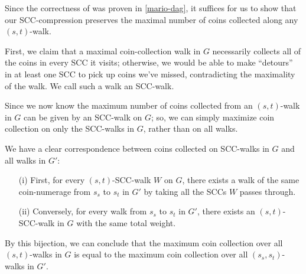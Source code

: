 \documentclass{article}
\begin{document}
\begin{solution}
\begin{subproof}[Correctness]
Since the correctness of  was proven in \ref{mario-dag}, it suffices for us to show that our SCC-compression preserves the maximal number of coins collected along any $(s,t)$-walk.

First, we claim that a maximal coin-collection walk in $G$ necessarily collects all of the coins in every SCC it visits; otherwise, we would be able to make ``detours'' in at least one SCC to pick up coins we've missed, contradicting the maximality of the walk. We call such a walk an SCC-walk.

Since we now know the maximum number of coins collected from an $(s,t)$-walk in $G$ can be given by an SCC-walk on $G$; so, we can simply maximize coin collection on only the SCC-walks in $G$, rather than on all walks.

We have a clear correspondence between coins collected on SCC-walks in $G$ and all walks in $G'$:
\begin{enumerate}
    \item [(i)] First, for every $(s,t)$-SCC-walk $W$ on $G$, there exists a walk of the same coin-numerage from $s_s$ to $s_t$ in $G'$ by taking all the SCCs $W$ passes through.
    \item [(ii)] Conversely, for every walk from $s_s$ to $s_t$ in $G'$, there exists an $(s,t)$-SCC-walk in $G$ with the same total weight.
\end{enumerate}

By this bijection, we can conclude that the maximum coin collection over all $(s,t)$-walks in $G$ is equal to the maximum coin collection over all $(s_s,s_t)$-walks in $G'$.
\end{subproof}

\end{solution}
\pagebreak
\end{document}
